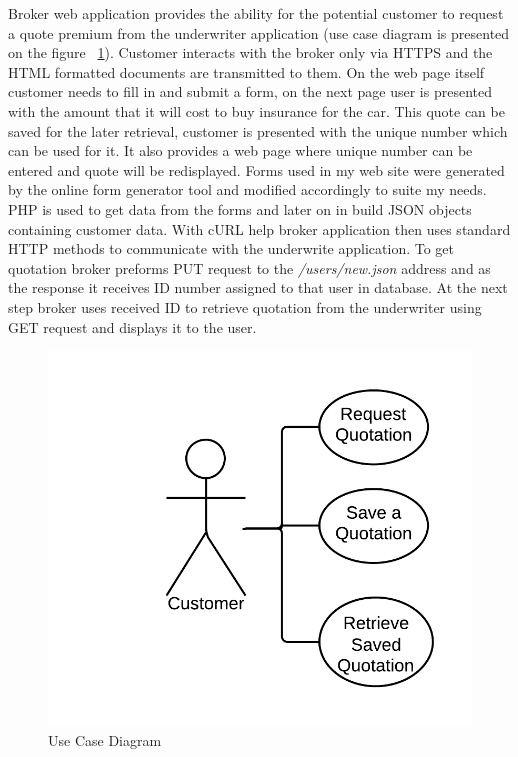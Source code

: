 \documentclass[10pt,a4paper,headinclude=true,twoside]{report}
\begin{document}
Broker web application provides the ability for the potential customer to request a quote premium from the underwriter application (use case diagram is presented on the figure ~\ref{fig:usecase}). Customer interacts with the broker only via HTTPS and the HTML formatted documents are transmitted to them. On the web page itself customer needs to fill in and submit a form, on the next page user is presented with the amount that it will cost to buy insurance for the car. This quote can be saved for the later retrieval, customer is presented with the unique number which can be used for it. It also provides a web page where unique number can be entered and quote will be redisplayed. Forms used in my web site were generated by the online form generator tool and modified accordingly to suite my needs. PHP is used to get data from the forms and later on in build JSON objects containing customer data. With cURL help broker application then uses standard HTTP methods to communicate with the underwrite application. To get quotation broker preforms PUT request to the \textit{/users/new.json} address and as the response it receives ID number assigned to that user in database. At the next step broker uses received ID to retrieve quotation from the underwriter using GET request and displays it to the user.


\begin{figure}[H]
\centering
\centerline{\includegraphics[scale=0.25]{./usecase}}
\caption{Use Case Diagram}
\label{fig:usecase}
\end{figure} 
\end{document}
